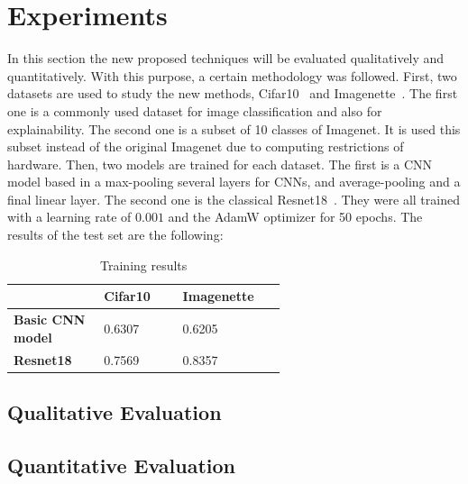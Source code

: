 \documentclass[preprint,12pt]{elsarticle}
\begin{document}
\section{Experiments}
\label{sec:experiments}
In this section the new proposed techniques will be evaluated qualitatively and quantitatively. With this purpose, a certain methodology was followed. First, two datasets are used to study the new methods, Cifar10~\cite{CIFAR10CIFAR100Datasets} and Imagenette~\cite{Imagenette2022}. The first one is a commonly used dataset for image classification and also for explainability. The second one is a subset of 10 classes of Imagenet. It is used this subset instead of the original Imagenet due to computing restrictions of hardware. Then, two models are trained for each dataset. The first is a CNN model based in a max-pooling several layers for CNNs, and average-pooling and a final linear layer. The second one is the classical Resnet18~\cite{heDeepResidualLearning2016}. They were all trained with a learning rate of $0.001$ and the AdamW optimizer for 50 epochs. The results of the test set are the following:

\begin{table}[h!]
    \begin{center}
        \begin{tabular}{|L{0.2\linewidth}|C{0.2\linewidth}|C{0.2\linewidth}|}
            \hline
            \textbf{} & \textbf{Cifar10} & \textbf{Imagenette}\\ \hline
            \textbf{Basic CNN model} & 0.6307 & 0.6205 \\ \hline
            \textbf{Resnet18} & 0.7569 & 0.8357 \\ \hline
        \end{tabular}
        \caption{Training results}
        \label{tab: training results}
    \end{center}
\end{table}

\subsection{Qualitative Evaluation}


\subsection{Quantitative Evaluation}



 

\end{document}
